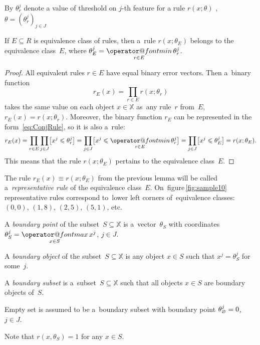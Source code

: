 \documentclass{article}
\makeatletter
\def\XX{\mathbb{X}}
\renewcommand{\leq}{\leqslant}
\renewcommand{\max}{\mathop{\operator@font max}\limits}
\renewcommand{\min}{\mathop{\operator@font min}\limits}
\renewcommand{\emph}[1]{\textit{#1}}
\makeatother
\begin{document}
By $\theta^j_r$ denote a value of threshold on $j$-th feature for a rule $r(x;\theta)$ ,
$\theta = (\theta^j_r)_{j\in J}$

\begin{lemma}
\label{lem:theta_E}
    If ${E \subseteq R}$ is equivalence class of rules,
    then a~rule $r(x;\theta_E)$
    belongs to the equivalence class~$E$,
    where
    $\theta_E^j = \min\limits_{r\in E} \theta^j_r$.
\end{lemma}
\begin{proof}
    All equivalent rules $r\in E$ have equal binary error vectors.
    Then a~binary function
    \[
        r_E(x) = \prod\limits_{r\in E} r( x; \theta_r )
    \]
    takes the same value on each object ${x\in\XX}$ as~any rule~$r$ from~$E$,
    ${r_E(x) = r(x; \theta_r)}$.
    Moreover, the binary function $r_E$ can be represented in the form~\eqref{eq:ConjRule},
    so it is also a~rule:
    \[
        r_E(x)
        =
        \prod_{r\in E}
            \prod_{j\in J}
            \bigl[ x^j\leq \theta^j_r \bigr]
        =
        \prod_{j\in J}
            \bigl[ x^j\leq \min_{r\in E} \theta^j_r \bigr]
        =
        \prod_{j\in J}
            \bigl[ x^j\leq \theta^j_E \bigr]
        = r(x;\theta_E).
    \]
    This means that the rule $r(x;\theta_E)$ pertains to the equivalence class~$E$.
\end{proof}

The rule $r_E(x) \equiv r(x;\theta_E)$ from the previous lemma will be called
a~\emph{representative rule} of the equivalence class~$E$.
On~figure\,\ref{fig:sample10}
representative rules correspond to~lower left corners of~equivalence classes:
$(0,0)$, $(1,8)$, $(2,5)$, $(5,1)$, etc.

A \emph{boundary point} of the subset~$S\subseteq \XX$ is a~vector~$\theta_S$ with coordinates
$\theta^j_S = \max\limits_{x\in S} x^j$,\;
$j\in J$.

A \emph{boundary object} of the subset~$S\subseteq \XX$ is any object $x\in S$ such that $x^j = \theta_S^j$ for some~$j$.

A \emph{boundary subset} is a~subset~$S\subseteq \XX$ such that all objects ${x\in S}$ are boundary objects of~$S$.

Empty set is assumed to be a~boundary subset with boundary point $\theta^j_{\varnothing}=0$, $j\in J$.

Note that $r(x,\theta_S) = 1$ for any $x\in S$.
\end{document}
